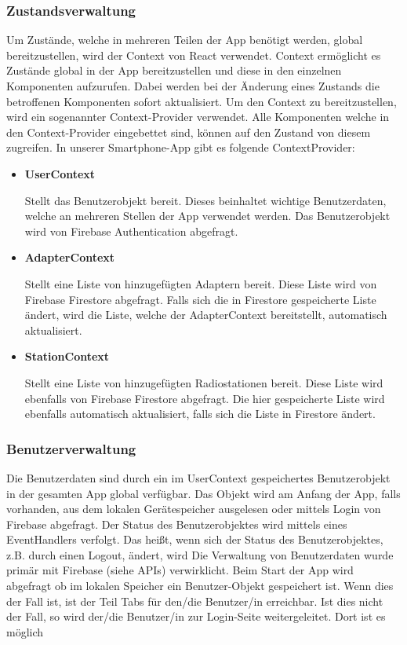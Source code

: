 \documentclass[11pt, twoside]{article}
\begin{document}
\subsubsection{Zustandsverwaltung}
Um Zustände, welche in mehreren Teilen der App benötigt werden, global bereitzustellen, wird der Context von React verwendet. Context ermöglicht es Zustände global in der App bereitzustellen und diese in den einzelnen Komponenten aufzurufen. Dabei werden bei der Änderung eines Zustands die betroffenen Komponenten sofort aktualisiert. Um den Context zu bereitzustellen, wird ein sogenannter Context-Provider verwendet. Alle Komponenten welche in den Context-Provider eingebettet sind, können auf den Zustand von diesem zugreifen. \parencite[vgl.][]{noauthor_urlpi23_nodate} In unserer Smartphone-App gibt es folgende ContextProvider:
\begin{itemize}
	\item \textbf{UserContext}
	\par Stellt das Benutzerobjekt bereit. Dieses beinhaltet wichtige Benutzerdaten, welche an mehreren Stellen der App verwendet werden. Das Benutzerobjekt wird von Firebase Authentication abgefragt.
	\item \textbf{AdapterContext}
	\par Stellt eine Liste von hinzugefügten Adaptern bereit. Diese Liste wird von Firebase Firestore abgefragt. Falls sich die in Firestore gespeicherte Liste ändert, wird die Liste, welche der AdapterContext bereitstellt, automatisch aktualisiert. 
	\item \textbf{StationContext}
	\par Stellt eine Liste von hinzugefügten Radiostationen bereit. Diese Liste wird ebenfalls von Firebase Firestore abgefragt. Die hier gespeicherte Liste wird ebenfalls automatisch aktualisiert, falls sich die Liste in Firestore ändert.
\end{itemize}
\subsubsection{Benutzerverwaltung}
Die Benutzerdaten sind durch ein im UserContext gespeichertes Benutzerobjekt in der gesamten App global verfügbar. Das Objekt wird am Anfang der App, falls vorhanden, aus dem lokalen Gerätespeicher ausgelesen oder mittels Login von Firebase abgefragt. Der Status des Benutzerobjektes wird mittels eines EventHandlers verfolgt. Das heißt, wenn sich der Status des Benutzerobjektes, z.B. durch einen Logout, ändert, wird 
Die Verwaltung von Benutzerdaten wurde primär mit Firebase (siehe APIs) verwirklicht. Beim Start der App wird abgefragt ob im lokalen Speicher ein Benutzer-Objekt gespeichert ist. Wenn dies der Fall ist, ist der Teil Tabs für den/die Benutzer/in erreichbar. Ist dies nicht der Fall, so wird der/die Benutzer/in zur Login-Seite weitergeleitet. Dort ist es möglich 
\end{document}

